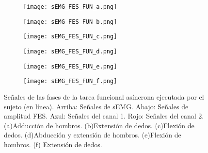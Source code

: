\begin{figure}[htbp]
	\centering
	\begin{subfigure}[htbp]{0.35\textwidth}
		\texttt{[image: sEMG\_FES\_FUN\_a.png]}
		\caption{}
		\label{Figura: Fun_Sen_A}
	\end{subfigure}
	\hspace*{1cm}
	\begin{subfigure}[htbp]{0.35\textwidth}
		\texttt{[image: sEMG\_FES\_FUN\_b.png]}
		\caption{}
		\label{Figura: Fun_Sen_B}
	\end{subfigure}
	\newline
	\begin{subfigure}[htbp]{0.35\textwidth}
		\texttt{[image: sEMG\_FES\_FUN\_c.png]}
		\caption{}
		\label{Figura: Fun_Sen_C}
	\end{subfigure}
	\hspace*{1cm}
	\begin{subfigure}[htbp]{0.35\textwidth}
		\texttt{[image: sEMG\_FES\_FUN\_d.png]}
		\caption{}
		\label{Figura: Fun_Sen_D}
	\end{subfigure}
	\newline
	\begin{subfigure}[htbp]{0.35\textwidth}
		\texttt{[image: sEMG\_FES\_FUN\_e.png]}
		\caption{}
		\label{Figura: Fun_Sen_E}
	\end{subfigure}
	\hspace*{1cm}
	\begin{subfigure}[htbp]{0.35\textwidth}
		\texttt{[image: sEMG\_FES\_FUN\_f.png]}
		\caption{}
		\label{Figura: Fun_F}
	\end{subfigure}
	\caption[Señales de las fases de la tarea funcional asíncrona ejecutada por el sujeto (en línea)]{Señales de las fases de la tarea funcional asíncrona ejecutada por el sujeto (en línea). Arriba: Señales de sEMG. Abajo: Señales de amplitud FES. Azul: Señales del canal 1. Rojo: Señales del canal 2. (a)Adducción de hombros. (b)Extensión de dedos. (c)Flexión de dedos. (d)Abducción y extensión de hombros. (e)Flexión de hombros. (f) Extensión de dedos.}
	\label{Figura: TareaFuncional_Senales}
\end{figure}

